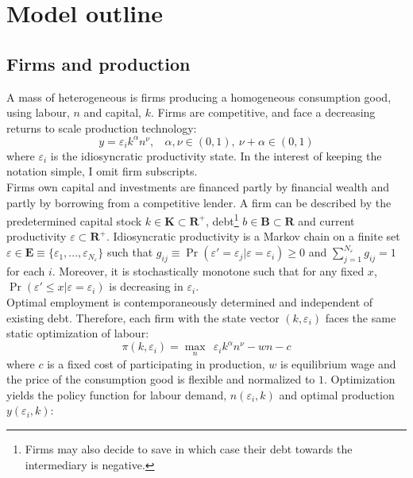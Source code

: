 \documentclass[12pt]{article}
\begin{document}
\section{Model outline \label{sec:model}}
\subsection{Firms and production \label{sec:production}}

A mass of heterogeneous is firms producing a homogeneous consumption good, using labour, $n$ and capital, $k$. Firms are competitive, and face a decreasing returns to scale production technology:
\begin{equation} \label{eq:prodf}
y = \varepsilon_i k^{\alpha}n^{\nu}, \ \ \ \ \alpha,\nu \in (0,1),  \ \nu + \alpha \in (0,1)
\end{equation}  
where $\varepsilon_i$ is the idiosyncratic productivity state. In the interest of keeping the notation simple, I omit firm subscripts. \vspace{3mm} \\
Firms own capital and investments are financed partly by financial wealth and partly by borrowing from a competitive lender. A firm can be described by the predetermined capital stock $k \in \mathbf{K} \subset \mathbf{R^{+}}$, debt\footnote{Firms may also decide to save in which case their debt towards the intermediary is negative.} $b \in \mathbf{B} \subset \mathbf{R}$ and current productivity $\varepsilon \subset \mathbf{R^+}$. Idiosyncratic productivity is a Markov chain on a finite set $\varepsilon \in \mathbf{E} \equiv \{ \varepsilon_1,...,\varepsilon_{N_{\varepsilon}} \}$ such that $ g_{ij} \equiv \Pr(\varepsilon'= \varepsilon_j|\varepsilon = \varepsilon_i) \geq 0$ and $\sum_{j=1}^{N_{\varepsilon}} g_{ij} = 1$ for each $i$. Moreover, it is stochastically monotone such that for any fixed $x$, $\Pr(\varepsilon' \leq x | \varepsilon = \varepsilon_i)$ is decreasing in $\varepsilon_i$. \vspace{3mm} \\
Optimal employment is contemporaneously determined and independent of existing debt. Therefore, each firm with the state vector $(k,\varepsilon_i)$ faces the same static optimization of labour: 
$$ \pi(k,\varepsilon_i) = \max_{n} \ \  \varepsilon_i k^{\alpha}n^{\nu} - wn - c$$
where $c$ is a fixed cost of participating in production, $w$ is equilibrium wage and the price of the consumption good is flexible and normalized to $1$. Optimization yields the policy function for labour demand, $n(\varepsilon_i,k)$ and optimal production $y(\varepsilon_i,k)$: 
\end{document}
